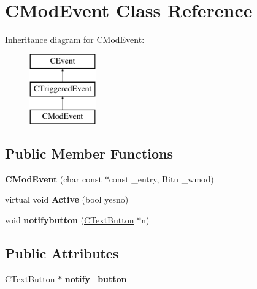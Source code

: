 \hypertarget{classCModEvent}{\section{C\-Mod\-Event Class Reference}
\label{classCModEvent}
}
Inheritance diagram for C\-Mod\-Event\-:\begin{figure}[H]
\begin{center}
\leavevmode
\includegraphics[height=3.000000cm]{classCModEvent}
\end{center}
\end{figure}
\subsection*{Public Member Functions}
\begin{DoxyCompactItemize}
\item 
\hypertarget{classCModEvent_a1bf7b8ec974c1944dbfa3737cac5e426}{{\bfseries C\-Mod\-Event} (char const $\ast$const \-\_\-entry, Bitu \-\_\-wmod)}\label{classCModEvent_a1bf7b8ec974c1944dbfa3737cac5e426}

\item 
\hypertarget{classCModEvent_a682d2590a915ef555a9f2c2d6aa927c8}{virtual void {\bfseries Active} (bool yesno)}\label{classCModEvent_a682d2590a915ef555a9f2c2d6aa927c8}

\item 
\hypertarget{classCModEvent_a20aea0373f707e3c8f047f6e52bf5f77}{void {\bfseries notifybutton} (\hyperlink{classCTextButton}{C\-Text\-Button} $\ast$n)}\label{classCModEvent_a20aea0373f707e3c8f047f6e52bf5f77}

\end{DoxyCompactItemize}
\subsection*{Public Attributes}
\begin{DoxyCompactItemize}
\item 
\hypertarget{classCModEvent_aa5dc746da9ec638e1959bfd1dddafc75}{\hyperlink{classCTextButton}{C\-Text\-Button} $\ast$ {\bfseries notify\-\_\-button}}\label{classCModEvent_aa5dc746da9ec638e1959bfd1dddafc75}

\end{DoxyCompactItemize}

